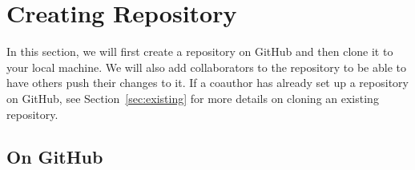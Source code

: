 
\section{Creating Repository}

In this section, we will first create a repository on GitHub and then clone it to your local machine.  We will also add collaborators to the repository to be able to have others push their changes to it.  If a coauthor has already set up a repository on GitHub, see Section~\ref{sec:existing} for more details on cloning an existing repository.

\subsection{On GitHub}

